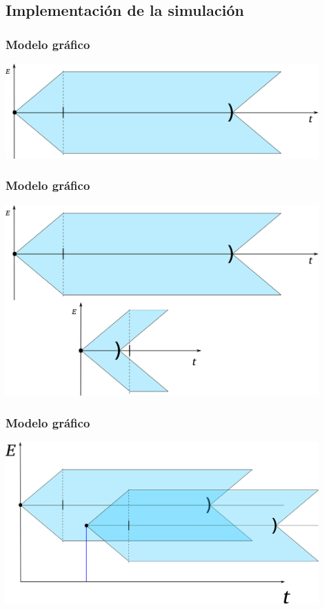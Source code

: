 \documentclass[handout]{beamer}
\theoremstyle{plain}
\theoremstyle{definition}
\theoremstyle{remark}
\begin{document}
                
\subsection{Implementación de la simulación}


\begin{frame}\frametitle{Modelo gráfico}
\centering
\includegraphics[width=0.9\textwidth]{text4616-5-8-3b.png}
\end{frame}%

\begin{frame}\frametitle{Modelo gráfico}
\centering
\includegraphics[width=0.9\textwidth]{text4616-5-8-3.png}
\end{frame}%

\begin{frame}\frametitle{Modelo gráfico}
\centering
\includegraphics[width=0.9\textwidth]{text4616-5.png}
\end{frame}%
\end{document}
